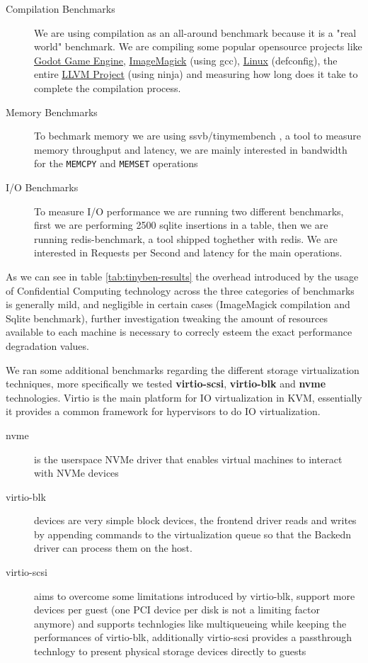 \documentclass[twocolumn]{article}
\begin{document}
    \begin{description}
        \item[Compilation Benchmarks] We are using compilation as an all-around benchmark because it is a "real world" benchmark. We are compiling some popular opensource projects like \href{https://github.com/godotengine/godot}{Godot Game Engine}, \href{https://github.com/imagemagick/imagemagick}{ImageMagick} (using gcc), \href{https://git.kernel.org/pub/scm/linux/kernel/git/torvalds/linux.git}{Linux} (defconfig), the entire \href{https://github.com/llvm/llvm-project}{LLVM Project} (using ninja) and measuring how long does it take to complete the compilation process.
        \item[Memory Benchmarks] To bechmark memory we are using ssvb/tinymembench \cite{tinymembench}, a tool to measure memory throughput and latency, we are mainly interested in bandwidth for the \texttt{MEMCPY} and \texttt{MEMSET} operations
        \item[I/O Benchmarks] To measure I/O performance we are running two different benchmarks, first we are performing 2500 sqlite insertions in a table, then we are running redis-benchmark, a tool shipped toghether with redis. We are interested in Requests per Second and latency for the main operations. 
    \end{description}

    As we can see in table \ref{tab:tinyben-results} the overhead introduced by the usage of Confidential Computing technology across the three categories of benchmarks is generally mild, and negligible in certain cases (ImageMagick compilation and Sqlite benchmark), further investigation tweaking the amount of resources available to each machine is necessary to correcly esteem the exact performance degradation values.

    We ran some additional benchmarks regarding the different storage virtualization techniques, more specifically we tested \textbf{virtio-scsi}, 
    \textbf{virtio-blk} and \textbf{nvme} technologies. Virtio is the main platform for IO virtualization in KVM, essentially it provides a common framework for hypervisors to do IO virtualization.

    \begin{description}
        \item[nvme] is the userspace NVMe driver that enables virtual machines to interact with NVMe devices
        \item[virtio-blk] devices are very simple block devices, the frontend driver reads and writes by appending commands to the virtualization queue so that the Backedn driver can process them on the host.
        \item[virtio-scsi] aims to overcome some limitations introduced by virtio-blk, support more devices per guest (one PCI device per disk is not a limiting factor anymore) and supports technlogies like multiqueueing while keeping the performances of virtio-blk, additionally virtio-scsi provides a passthrough technlogy to present physical storage devices directly to guests
    \end{description}
\end{document}
